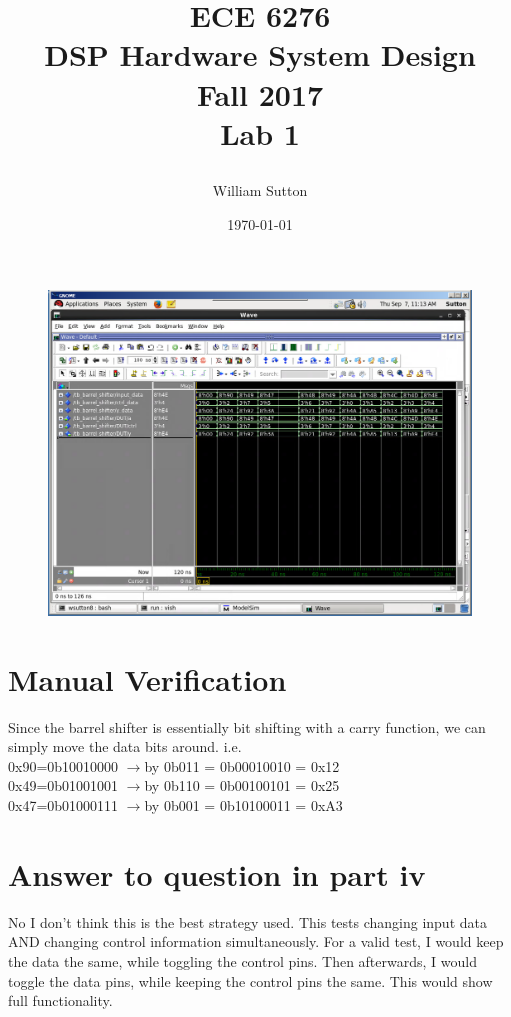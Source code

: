 \documentclass[11pt]{report}
\title{
		\Huge{
				\textbf{ECE 6276
						\\DSP Hardware System Design
						\\Fall 2017}}
			\\[2cm]
		\LARGE{
			\textnormal{Lab 1}}
			\\[1cm]
			\date{\today}
		\large{
			\author{William Sutton}
		}}
\begin{document}
\lstset{language=MATLAB}
\maketitle

\newpage

		\begin{figure}[!ht]
 		 \caption{}
  		 \centering
    	 \includegraphics[width=1.2\textwidth]{Screenshot_2017-09-05_21-26-20.png}
		\end{figure}
		\newpage
		
\section*{Manual Verification}
Since the barrel shifter is essentially bit shifting with a carry function, we can simply move the data bits around. i.e.\\

0x90=0b10010000 $\rightarrow $by 0b011 = 0b00010010 = 0x12\\
0x49=0b01001001 $\rightarrow $by 0b110 = 0b00100101 = 0x25\\
0x47=0b01000111 $\rightarrow $by 0b001 = 0b10100011 = 0xA3\\
\section*{Answer to question in part iv}
No I don't think this is the best strategy used. This tests changing input data AND changing control information simultaneously. For a valid test, I would keep the data the same, while toggling the control pins. Then afterwards, I would toggle the data pins, while keeping the control pins the same. This would show full functionality.
\end{document}
